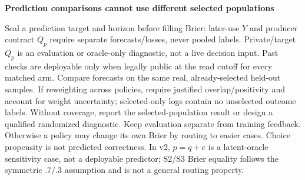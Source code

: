 \documentclass[10pt,a4paper]{article}
\newcommand{\lead}[1]{\vspace{4pt}\textbf{#1}\par}
\begin{document}
\lead{Prediction comparisons cannot use different selected populations}
Seal a prediction target and horizon before filling Brier: later-use
$Y$ and producer contract $Q_p$ require separate forecasts/losses, never pooled
labels. Private/target $Q_p$ is an evaluation or oracle-only diagnostic, not a
live decision input. Past checks are deployable only when legally public at
the read cutoff for every matched arm.
Compare forecasts on the same real, already-selected held-out samples. If
reweighting across policies, require justified overlap/positivity and account for
weight uncertainty; selected-only logs contain no unselected outcome labels.
Without coverage, report the selected-population result or design a qualified
randomized diagnostic. Keep evaluation separate from training feedback.
Otherwise a policy may
change its own Brier by routing to easier cases. Choice propensity is not
predicted correctness. In v2, $p=q+e$ is a latent-oracle sensitivity case,
not a deployable predictor; S2/S3 Brier equality follows the symmetric $.7/.3$
assumption and is not a general routing property.
\end{document}
